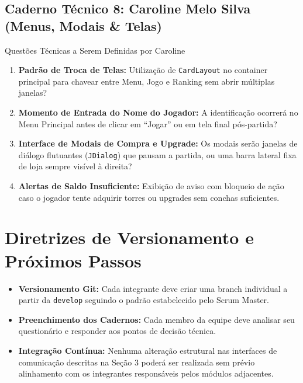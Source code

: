 \documentclass[11pt,a4paper]{article}
\begin{document}
\subsection{Caderno Técnico 8: Caroline Melo Silva (Menus, Modais \& Telas)}

\begin{perguntaBox}{Questões Técnicas a Serem Definidas por Caroline}
\begin{enumerate}
  \item \textbf{Padrão de Troca de Telas:} Utilização de \texttt{CardLayout} no container principal para chavear entre Menu, Jogo e Ranking sem abrir múltiplas janelas?
  \item \textbf{Momento de Entrada do Nome do Jogador:} A identificação ocorrerá no Menu Principal antes de clicar em ``Jogar'' ou em tela final pós-partida?
  \item \textbf{Interface de Modais de Compra e Upgrade:} Os modais serão janelas de diálogo flutuantes (\texttt{JDialog}) que pausam a partida, ou uma barra lateral fixa de loja sempre visível à direita?
  \item \textbf{Alertas de Saldo Insuficiente:} Exibição de aviso com bloqueio de ação caso o jogador tente adquirir torres ou upgrades sem conchas suficientes.
\end{enumerate}
\end{perguntaBox}

\newpage
\section{Diretrizes de Versionamento e Próximos Passos}

\begin{itemize}[leftmargin=*]
  \item \textbf{Versionamento Git:} Cada integrante deve criar uma branch individual a partir da \texttt{develop} seguindo o padrão estabelecido pelo Scrum Master.
  \item \textbf{Preenchimento dos Cadernos:} Cada membro da equipe deve analisar seu questionário e responder aos pontos de decisão técnica.
  \item \textbf{Integração Contínua:} Nenhuma alteração estrutural nas interfaces de comunicação descritas na Seção 3 poderá ser realizada sem prévio alinhamento com os integrantes responsáveis pelos módulos adjacentes.
\end{itemize}
\end{document}
